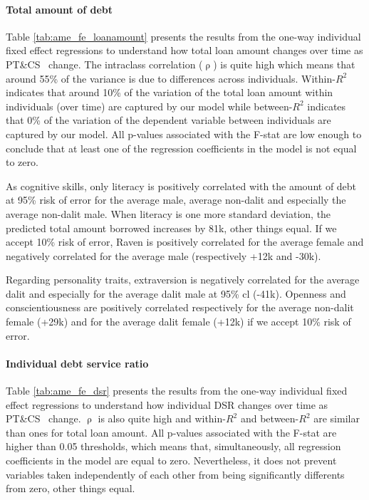 \documentclass[a4paper, 12pt, onecolumn]{article}
\newcommand{\sd}{standard deviation}
\newcommand{\ote}{other things equal}
\newcommand{\PTCS}{PT\&CS}
\begin{document}
\paragraph{Total amount of debt}
Table \ref{tab:ame_fe_loanamount} presents the results from the one-way individual fixed effect regressions to understand how total loan amount changes over time as \PTCS~ change.
The intraclass correlation ($\uprho$) is quite high which means that around 55\% of the variance is due to differences across individuals. 
Within-$R^2$ indicates that around 10\% of the variation of the total loan amount within individuals (over time) are captured by our model while between-$R^2$ indicates that 0\% of the variation of the dependent variable between individuals are captured by our model.
All p-values associated with the F-stat are low enough to conclude that at least one of the regression coefficients in the model is not equal to zero.

As cognitive skills, only literacy is positively correlated with the amount of debt at 95\% risk of error for the average male, average non-dalit and especially the average non-dalit male.
When literacy is one more \sd, the predicted total amount borrowed increases by \rupee81k, \ote.
If we accept 10\% risk of error, Raven is positively correlated for the average female and negatively correlated for the average male (respectively +\rupee12k and -\rupee30k).

Regarding personality traits, extraversion is negatively correlated for the average dalit and especially for the average dalit male at 95\% cl (-\rupee41k).
Openness and conscientiousness are positively correlated respectively for the average non-dalit female (+\rupee29k) and for the average dalit female (+\rupee12k) if we accept 10\% risk of error.



\paragraph{Individual debt service ratio}
Table \ref{tab:ame_fe_dsr} presents the results from the one-way individual fixed effect regressions to understand how individual DSR changes over time as \PTCS~ change.
$\uprho$ is also quite high and within-$R^2$ and between-$R^2$ are similar than ones for total loan amount.
All p-values associated with the F-stat are higher than 0.05 thresholds, which means that, simultaneously, all regression coefficients in the model are equal to zero. 
Nevertheless, it does not prevent variables taken independently of each other from being significantly differents from zero, \ote.
\end{document}
